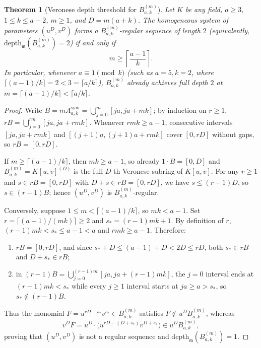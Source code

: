 \documentclass[11pt]{amsart}
\newtheorem{theorem}{Theorem}[section]
\theoremstyle{definition}
\theoremstyle{remark}
\newcommand{\mm}{\mathfrak{m}}
\newcommand{\depth}{\mathrm{depth}}
\newcommand{\ceil}[1]{\left\lceil #1 \right\rceil}
\begin{document}
\begin{theorem}[{Veronese depth threshold for $B_{a,k}^{(m)}$}]
\label{thm:veronese}
Let $K$ be any field, $a \ge 3$, $1 \le k \le a - 2$, $m \ge 1$, and $D = m(a+k)$. The homogeneous system of parameters $(u^D, v^D)$ forms a $B_{a,k}^{(m)}$-regular sequence of length $2$ (equivalently, $\depth_{\mm}(B_{a,k}^{(m)}) = 2$) if and only if
\[
  m \ge \ceil{\frac{a-1}{k}}.
\]
In particular, whenever $a \equiv 1 \pmod{k}$ (such as $a = 5, k = 2$, where $\lceil (a-1)/k \rceil = 2 < 3 = \lceil a/k \rceil$), $B_{a,k}^{(m)}$ already achieves full depth $2$ at $m = \lceil (a-1)/k \rceil < \lceil a/k \rceil$.
\end{theorem}

\begin{proof}
Write $B = m A^{\mathrm{sym}}_{a,k} = \bigcup_{j=0}^m [ja, ja + mk]$; by induction on $r \ge 1$, $r B = \bigcup_{j=0}^{rm} [ja, ja + rmk]$. Whenever $rmk \ge a - 1$, consecutive intervals $[ja, ja + rmk]$ and $[(j+1)a, (j+1)a + rmk]$ cover $[0, rD]$ without gaps, so $r B = [0, rD]$.

If $m \ge \lceil (a-1)/k \rceil$, then $mk \ge a - 1$, so already $1 \cdot B = [0, D]$ and $B_{a,k}^{(m)} = K[u,v]^{(D)}$ is the full $D$-th Veronese subring of $K[u,v]$. For any $r \ge 1$ and $s \in r B = [0, rD]$ with $D + s \in r B = [0, rD]$, we have $s \le (r-1)D$, so $s \in (r-1)B$; hence $(u^D, v^D)$ is $B_{a,k}^{(m)}$-regular.

Conversely, suppose $1 \le m < \lceil (a-1)/k \rceil$, so $mk < a - 1$. Set $r = \lceil (a-1)/(mk) \rceil \ge 2$ and $s_* = (r - 1)mk + 1$. By definition of $r$, $(r - 1)mk < s_* \le a - 1 < a$ and $rmk \ge a - 1$. Therefore:
\begin{enumerate}
  \item[(1)] $r B = [0, rD]$, and since $s_* + D \le (a - 1) + D < 2D \le rD$, both $s_* \in r B$ and $D + s_* \in r B$;
  \item[(2)] in $(r-1)B = \bigcup_{j=0}^{(r-1)m} [ja, ja + (r-1)mk]$, the $j=0$ interval ends at $(r-1)mk < s_*$ while every $j \ge 1$ interval starts at $ja \ge a > s_*$, so $s_* \notin (r-1)B$.
\end{enumerate}
Thus the monomial $F = u^{rD - s_*} v^{s_*} \in B_{a,k}^{(m)}$ satisfies $F \notin u^D B_{a,k}^{(m)}$, whereas
\[
  v^D F = u^D \cdot \bigl(u^{rD - (D+s_*)} v^{D+s_*}\bigr) \in u^D B_{a,k}^{(m)},
\]
proving that $(u^D, v^D)$ is not a regular sequence and $\depth_{\mm}(B_{a,k}^{(m)}) = 1$.
\end{proof}
\end{document}
